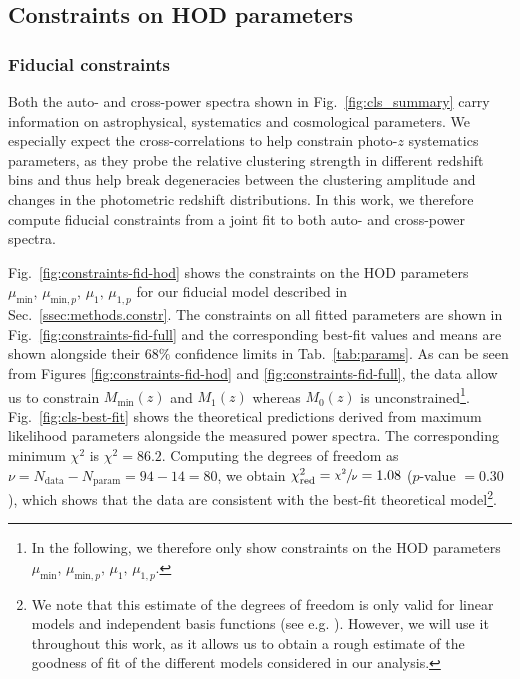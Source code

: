 \documentclass[a4paper,11pt]{article}
\begin{document}
  \subsection{Constraints on HOD parameters}\label{ssec:results.hod-constraints}
    \subsubsection{Fiducial constraints}\label{sssec:results.hod-constraints.fiducial}
      Both the auto- and cross-power spectra shown in Fig.~\ref{fig:cls_summary} carry information on astrophysical, systematics and cosmological parameters. We especially expect the cross-correlations to help constrain photo-$z$ systematics parameters, as they probe the relative clustering strength in different redshift bins and thus help break degeneracies between the clustering amplitude and changes in the photometric redshift distributions. In this work, we therefore compute fiducial constraints from a joint fit to both auto- and cross-power spectra.

      Fig.~\ref{fig:constraints-fid-hod} shows the constraints on the HOD parameters $\mu_{\mathrm{min}}, \allowbreak \, \mu_{\mathrm{min}, p}, \allowbreak \, \mu_{1}, \allowbreak \, \mu_{1, p}$ for our fiducial model described in Sec.~\ref{ssec:methods.constr}. The constraints on all fitted parameters are shown in Fig.~\ref{fig:constraints-fid-full} and the corresponding best-fit values and means are shown alongside their $68 \%$ confidence limits in Tab.~\ref{tab:params}. As can be seen from Figures \ref{fig:constraints-fid-hod} and \ref{fig:constraints-fid-full}, the data allow us to constrain $M_{\mathrm{min}}(z)$ and $M_{1}(z)$ whereas $M_{0}(z)$ is unconstrained\footnote{In the following, we therefore only show constraints on the HOD parameters $\mu_{\mathrm{min}}, \, \mu_{\mathrm{min}, p}, \, \mu_{1}, \, \mu_{1, p}$.}. Fig.~\ref{fig:cls-best-fit} shows the theoretical predictions derived from maximum likelihood parameters alongside the measured power spectra. The corresponding minimum $\chi^{2}$ is $\chi^{2} = 86.2$. Computing the degrees of freedom as $\nu = N_{\mathrm{data}} - N_{\mathrm{param}} = 94 - 14 = 80$, we obtain $\chi^{2}_{\mathrm{red}} = \sfrac{\chi^{2}}{\nu} = 1.08$ ($p$-value $= 0.30$), which shows that the data are consistent with the best-fit theoretical model\footnote{We note that this estimate of the degrees of freedom is only valid for linear models and independent basis functions (see e.g. \cite{Andrae:2010}). However, we will use it throughout this work, as it allows us to obtain a rough estimate of the goodness of fit of the different models considered in our analysis.}.
\end{document}
